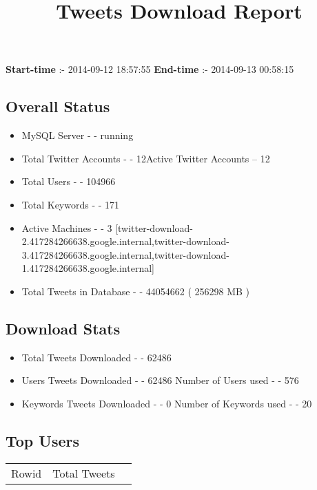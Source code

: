 \documentclass{article}\usepackage[T1]{fontenc}
\begin{document}
\title{\textbf{Tweets Download Report}}
               \date{}
                \maketitle
               \centerline{\textbf{Start-time} :- 2014-09-12 18:57:55 \hspace{40pt} \textbf{End-time} :- 2014-09-13 00:58:15}               \subsection*{Overall Status}                \begin{itemize}                \item MySQL Server - - running               \item Total Twitter Accounts - - 12\newline Active Twitter Accounts -- 12               \item Total Users - - 104966               \item Total Keywords - - 171               \item Active Machines - - 3 [twitter-download-2.417284266638.google.internal,twitter-download-3.417284266638.google.internal,twitter-download-1.417284266638.google.internal]               \item Total Tweets in Database - - 44054662 ( 256298 MB )               \end{itemize}               \subsection*{Download Stats}                \begin{itemize}                \item Total Tweets Downloaded - - 62486               \item Users Tweets Downloaded - - 62486 \newline Number of Users used - - 576               \item Keywords Tweets Downloaded - - 0 \newline Number of Keywords used - - 20              \end{itemize}              \subsection*{Top Users}\begin{tabular}{|c|c|c|}         \hline         Rowid & Total Tweets \\ 

\end{tabular}
\end{document}
